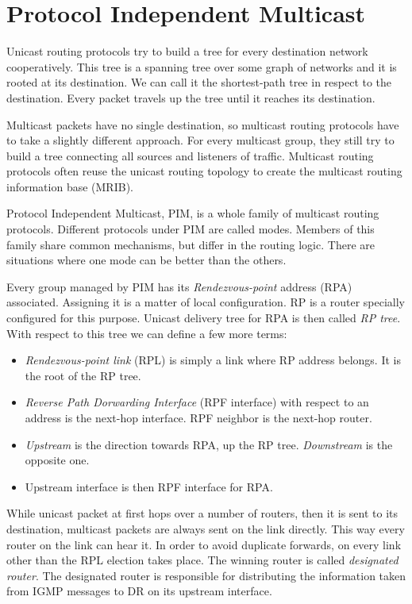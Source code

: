 \chapter{Protocol Independent Multicast}

Unicast routing protocols try to build a tree for every destination network
cooperatively. This tree is a  spanning tree over some graph of networks and it
is rooted at its destination. We can call it the shortest-path tree in respect
to the destination. Every packet travels up the tree until it reaches its
destination.

Multicast packets have no single destination, so multicast routing protocols
have to take a slightly different approach. For every multicast group, they still
try to build a tree connecting all sources and listeners of traffic. Multicast
routing protocols often reuse the unicast routing topology to create the
multicast routing information base (MRIB).

Protocol Independent Multicast, PIM, is a whole family of multicast routing
protocols. Different protocols under PIM are called modes. Members of this
family share common mechanisms, but differ in the routing logic. There are
situations where one mode can be better than the others.

Every group managed by PIM has its \emph{Rendezvous-point} address (RPA)
associated. Assigning it is a matter of local configuration. RP is a router
specially configured for this purpose. Unicast delivery tree for RPA is then
called \emph{RP tree}. With respect to this tree we can define a few more terms:

\begin{itemize}
\item\emph{Rendezvous-point link} (RPL) is simply a link where RP address belongs.
  It is the root of the RP tree.
\item\emph{Reverse Path Dorwarding Interface} (RPF interface) with respect to
  an address is the next-hop interface. RPF neighbor is the next-hop router.
\item\emph{Upstream} is the direction towards RPA, up the RP tree.
  \emph{Downstream} is the opposite one.
\item{Upstream interface} is then RPF interface for RPA.
\end{itemize}

While unicast packet at first hops over a number of routers, then it is sent to
its destination, multicast packets are always sent on the link directly. This
way every router on the link can hear it. In order to avoid duplicate forwards, on
every link other than the RPL election takes place. The winning router is called
\emph{designated router}. The designated router is responsible for distributing
the information taken from IGMP messages to DR on its upstream interface.

